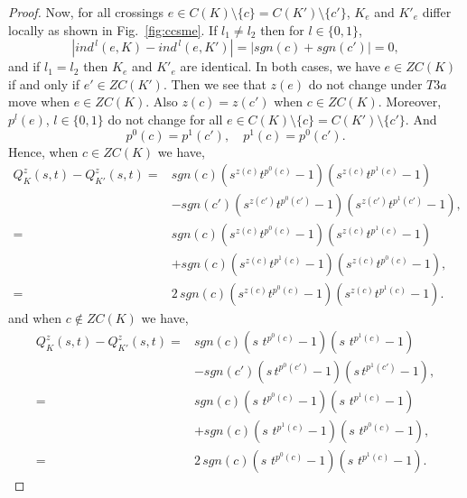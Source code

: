 \documentclass[10pt,a4paper,reqno]{amsart}
\theoremstyle{definition}
\theoremstyle{remark}
\begin{document}
\begin{proof}
	Now, for all crossings $e \in C(K) \setminus \{c\}= C(K')\setminus \{c'\}$,  $K_{e}$ and $K'_{e}$ differ locally as shown in Fig.~\ref{fig:ccsme}. If $l_{1}\neq l_{2}$ then for $l \in \{0,1\}$,
	\[	|ind ^{\,l}(e,K)-ind ^{\,l}(e,K')|=|sgn(c)+sgn(c')|=0,\]
	and if $l_{1}= l_{2}$ then $K_{e}$ and $K'_{e}$ are identical. In both cases, we have  $e \in ZC(K)$ if and only if $e' \in ZC(K')$.
	Then we see that $z(e)$ do not change under $T3a$ move when $ e\in ZC(K)$.
Also $z(c) = z(c')$ when $c \in ZC(K)$.
Moreover, $p^{l}(e)$, $l \in \{0,1\}$ do not change for all $ e \in C(K)\setminus \{c\}= C(K')\setminus \{c'\}$. And
	\[p^{0}(c)=p^{1}(c'), \quad p^{1}(c)=p^{0}(c').\]
	Hence, when $c \in ZC(K)$ we have,
	\begin{align*}
		Q^{z}_{K}(s,t)-Q^{z}_{K'}(s,t) =&sgn(c)(s^{z(c)}t^{p^{0}(c)}-1)(s^{z(c)}t^{p^{1}(c)}-1)\\ &-sgn(c')(s^{z(c')}t^{p^{0}(c')}-1)(s^{z(c')}t^{p^{1}(c')}-1),\\
		=&sgn(c)(s^{z(c)}t^{p^{0}(c)}-1)(s^{z(c)}t^{p^{1}(c)}-1)\\ &+sgn(c)(s^{z(c)}t^{p^{1}(c)}-1)(s^{z(c)}t^{p^{0}(c)}-1),\\
		=& 2\,sgn(c)(s^{z(c)}t^{p^{0}(c)}-1)(s^{z(c)}t^{p^{1}(c)}-1).
	\end{align*}
and	when $c \notin ZC(K)$ we have,
	\begin{align*}
		Q^{z}_{K}(s,t)-Q^{z}_{K'}(s,t) =&sgn(c)(s\,\,t^{p^{0}(c)}-1)(s\,\,t^{p^{1}(c)}-1)\\ &-sgn(c')(s\,t^{p^{0}(c')}-1)(s\,t^{p^{1}(c')}-1),\\
		=&sgn(c)(s\,\,t^{p^{0}(c)}-1)(s\,\,t^{p^{1}(c)}-1)\\ &+sgn(c)(s\,\,t^{p^{1}(c)}-1)(s\,\,t^{p^{0}(c)}-1),\\
		=& 2\,sgn(c)(s\,\,t^{p^{0}(c)}-1)(s\,\,t^{p^{1}(c)}-1).
	\end{align*}
\end{proof}
\end{document}
